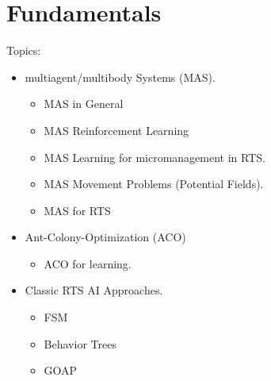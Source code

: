 
\chapter{Fundamentals}
\label{ch:Fundamentals}

Topics:
\begin{itemize}[noitemsep,nolistsep]
	\item multiagent/multibody Systems (MAS).
	\begin{itemize}[noitemsep,nolistsep]
		\item MAS in General
		\item MAS Reinforcement Learning
		\item MAS Learning for micromanagement in RTS.
		\item MAS Movement Problems (Potential Fields).
		\item MAS for RTS
	\end{itemize}
	\item Ant-Colony-Optimization (ACO)
	\begin{itemize}[noitemsep,nolistsep]
		\item ACO for learning.
	\end{itemize}
	\item Classic RTS AI Approaches.
	\begin{itemize}[noitemsep,nolistsep]
		\item FSM
		\item Behavior Trees
		\item GOAP
	\end{itemize}
\end{itemize}
